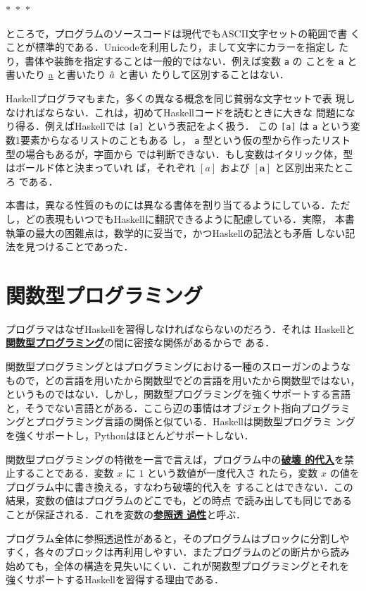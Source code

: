 \documentclass[a5paper,twoside,fleqn]{jsbook}
\newcommand{\separator}{\begin{center}$*$~$*$~$*$\end{center}}
\newcommand{\programminglanguage}[1]{\textsf{#1}}
\newcommand{\haskell}{\programminglanguage{Haskell}}
\newcommand{\python}{\programminglanguage{Python}}
\newcommand{\keyword}[1]{{\underline{\textbf{#1}}}}
\newcommand{\code}[1]{\texttt{#1}}
\newcommand{\mType}[1]{\mathbf{#1}}
\newcommand{\mListType}[1]{[\mType{#1}]}
\newcommand{\mListWith}[1]{\left[#1\right]}
\begin{document}
\separator

ところで，プログラムのソースコードは現代でもASCII文字セットの範囲で書
くことが標準的である．Unicodeを利用したり，まして文字にカラーを指定し
たり，書体や装飾を指定することは一般的ではない．例えば変数 \code{a} の
ことを \textbf{a} と書いたり \underline{a} と書いたり $\Hat a$ と書い
たりして区別することはない．

\haskell プログラマもまた，多くの異なる概念を同じ貧弱な文字セットで表
現しなければならない．これは，初めて\haskell コードを読むときに大きな
問題になり得る．例えば\haskell では \code{[a]} という表記をよく扱う．
この \code{[a]} は \code{a} という変数1要素からなるリストのこともある
し， \code{a} 型という仮の型から作ったリスト型の場合もあるが，字面から
では判断できない．もし変数はイタリック体，型はボールド体と決まっていれ
ば，それぞれ $\mListWith{a}$ および $\mListType{a}$ と区別出来たところ
である．

本書は，異なる性質のものには異なる書体を割り当てるようにしている．ただ
し，どの表現もいつでも\haskell に翻訳できるように配慮している．実際，
本書執筆の最大の困難点は，数学的に妥当で，かつ\haskell の記法とも矛盾
しない記法を見つけることであった．

\section{関数型プログラミング}

プログラマはなぜ\haskell を習得しなければならないのだろう．それは
\haskell と\keyword{関数型プログラミング}の間に密接な関係があるからで
ある．

関数型プログラミングとはプログラミングにおける一種のスローガンのような
もので，どの言語を用いたから関数型でどの言語を用いたから関数型ではない，
というものではない．しかし，関数型プログラミングを強くサポートする言語
と，そうでない言語とがある．ここら辺の事情はオブジェクト指向プログラミ
ングとプログラミング言語の関係と似ている．\haskell は関数型プログラミ
ングを強くサポートし，\python はほとんどサポートしない．

関数型プログラミングの特徴を一言で言えば，プログラム中の\keyword{破壊
  的代入}を禁止することである．変数 $x$ に $1$ という数値が一度代入さ
れたら，変数 $x$ の値をプログラム中に書き換える，すなわち破壊的代入を
することはできない．この結果，変数の値はプログラムのどこでも，どの時点
で読み出しても同じであることが保証される．これを変数の\keyword{参照透
  過性}と呼ぶ．

プログラム全体に参照透過性があると，そのプログラムはブロックに分割しや
すく，各々のブロックは再利用しやすい．またプログラムのどの断片から読み
始めても，全体の構造を見失いにくい．これが関数型プログラミングとそれを
強くサポートする\haskell を習得する理由である．
\end{document}
